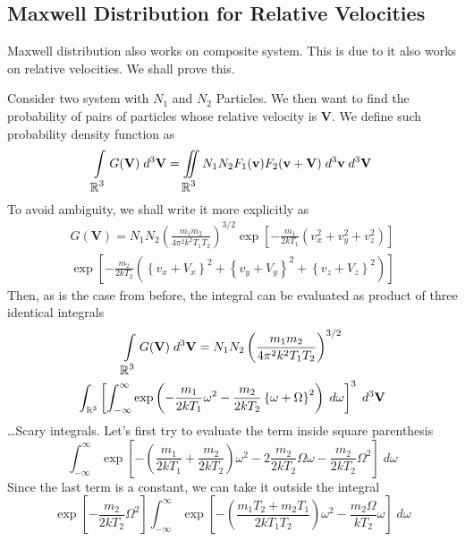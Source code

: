\documentclass[../../../Main.tex]{subfiles}
\begin{document}
\subsection{Maxwell Distribution for Relative Velocities}
Maxwell distribution also works on composite system. This is due to it also works on relative velocities. We shall prove this.

Consider two system with $N_1$ and $N_2$ Particles. We then want to find the probability of pairs of particles whose relative velocity is $\mathbf{V}$. We define such probability density function as 
\begin{equation*}
    \int\displaylimits_{\displaystyle\mathbb{R}^3} G(\mathbf{V}) \; d^3\mathbf{V} = \iint\displaylimits_{ \displaystyle \mathbb{R}^3} N_1 N_2 F_1(\mathbf{v}) F_2(\mathbf{v+V}) \; d^3\mathbf{v}\; d^3\mathbf{V}
\end{equation*}
To avoid ambiguity, we shall write it more explicitly as 
\begin{multline*}
    G(\mathbf{V}) = N_1 N_2 \left(\frac{m_1 m_2}{4\pi^2 k^2 T_1 T_2}\right)^{3/2} 
    \exp\left[-\frac{m_1}{2k T_1 }\left( v_x^2+v_y^2+v_z^2 \right)\right] \\
    \exp\left[-\frac{m_2}{2k T_2 }\left( \left\{v_x+V_x\right\}^2+ \left\{v_y+V_y\right\}^2 + \left\{v_z+V_z\right\}^2\right)\right] 
\end{multline*}
Then, as is the case from before, the integral can be evaluated as product of three identical integrals
\begin{multline*}
    \int\displaylimits_{\displaystyle\mathbb{R}^3} G(\mathbf{V}) \; d^3\mathbf{V} =N_1 N_2 \left(\frac{m_1 m_2}{4\pi^2 k^2 T_1 T_2}\right)^{3/2} \\
    \int_{\mathbb{R}^3}\left[  \int_{-\infty}^{\infty}\exp\left( -\frac{m_1}{2kT_1} \omega^2-\frac{m_2}{2kT_2}\left\{\omega + \Omega\right\}^2 \right)\;d\omega \right]^3\;d^3\mathbf{V}
\end{multline*}
\dots Scary integrals. Let's first try to evaluate the term inside square parenthesis
\begin{equation*}
    \int_{-\infty}^{\infty}\exp\left[-\left(\frac{m_1}{2kT_1} +\frac{m_2}{2kT_2} \right) \omega^2 -2\frac{m_2}{2kT_2}\Omega\omega -\frac{m_2}{2kT_2}\Omega^2\right] \;d\omega 
\end{equation*}
Since the last term is a constant, we can take it outside the integral
\begin{equation*}
    \exp\left[-\frac{m_2}{2kT_2}\Omega^2\right]\int_{-\infty}^{\infty}\exp\left[-\left(\frac{m_1T_2+ m_2T_1}{2kT_1T_2} \right) \omega^2 -\frac{m_2\Omega}{kT_2}\omega \right] \;d\omega 
\end{equation*}
\end{document}
